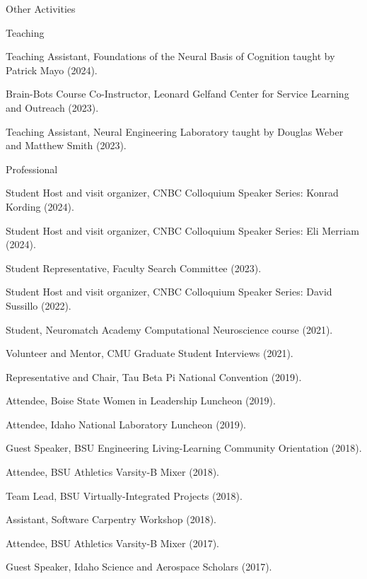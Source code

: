 \documentclass{resume} %
\begin{document}
\begin{rSection}{Other Activities}
\begin{rSubsection2}{Teaching}{}{}{}
\item Teaching Assistant, Foundations of the Neural Basis of Cognition taught by Patrick Mayo (2024).
\item Brain-Bots Course Co-Instructor, Leonard Gelfand Center for Service Learning and Outreach (2023).
\item Teaching Assistant, Neural Engineering Laboratory taught by Douglas Weber and Matthew Smith (2023).
\end{rSubsection2}
\begin{rSubsection2}{Professional}{}{}{}
\item Student Host and visit organizer, CNBC Colloquium Speaker Series: Konrad Kording (2024).
\item Student Host and visit organizer, CNBC Colloquium Speaker Series: Eli Merriam (2024).
\item Student Representative, Faculty Search Committee (2023).
\item Student Host and visit organizer, CNBC Colloquium Speaker Series: David Sussillo (2022).
\item Student, Neuromatch Academy Computational Neuroscience course (2021).
\item Volunteer and Mentor, CMU Graduate Student Interviews (2021).
\item Representative and Chair, Tau Beta Pi National Convention (2019). 
\item Attendee, Boise State Women in Leadership Luncheon (2019).
\item Attendee, Idaho National Laboratory Luncheon (2019).
\item Guest Speaker, BSU Engineering Living-Learning Community Orientation (2018).
\item Attendee, BSU Athletics Varsity-B Mixer (2018).
\item Team Lead, BSU Virtually-Integrated Projects (2018).
\item Assistant, Software Carpentry Workshop (2018).
\item Attendee, BSU Athletics Varsity-B Mixer (2017).
\item Guest Speaker, Idaho Science and Aerospace Scholars (2017).
\end{rSubsection2}


\end{rSection}
\end{document}
